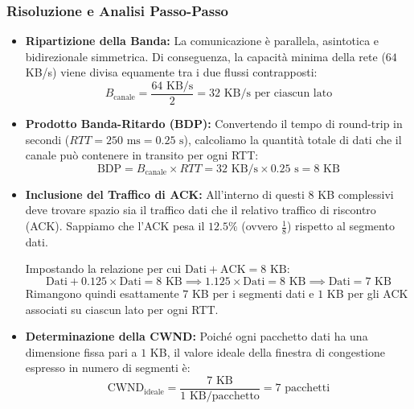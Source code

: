 \documentclass[11pt,a4paper]{report}
\begin{document}
\subsubsection*{Risoluzione e Analisi Passo-Passo}
\begin{itemize}
    \item \textbf{Ripartizione della Banda:} La comunicazione è parallela, asintotica e bidirezionale simmetrica. Di conseguenza, la capacità minima della rete ($64$ KB/s) viene divisa equamente tra i due flussi contrapposti:
    \begin{equation}
        B_{\text{canale}} = \frac{64 \text{ KB/s}}{2} = 32 \text{ KB/s per ciascun lato}
    \end{equation}

    \item \textbf{Prodotto Banda-Ritardo (BDP):} Convertendo il tempo di round-trip in secondi ($RTT = 250 \text{ ms} = 0.25 \text{ s}$), calcoliamo la quantità totale di dati che il canale può contenere in transito per ogni RTT:
    \begin{equation}
        \text{BDP} = B_{\text{canale}} \times RTT = 32 \text{ KB/s} \times 0.25 \text{ s} = 8 \text{ KB}
    \end{equation}

    \item \textbf{Inclusione del Traffico di ACK:} All'interno di questi $8$ KB complessivi deve trovare spazio sia il traffico dati che il relativo traffico di riscontro (ACK). Sappiamo che l'ACK pesa il $12.5\%$ (ovvero $\frac{1}{8}$) rispetto al segmento dati. 
    
    Impostando la relazione per cui $\text{Dati} + \text{ACK} = 8 \text{ KB}$:
    \begin{equation}
        \text{Dati} + 0.125 \times \text{Dati} = 8 \text{ KB} \implies 1.125 \times \text{Dati} = 8 \text{ KB} \implies \text{Dati} = 7 \text{ KB}
    \end{equation}
    Rimangono quindi esattamente $7$ KB per i segmenti dati e $1$ KB per gli ACK associati su ciascun lato per ogni RTT.

    \item \textbf{Determinazione della CWND:} Poiché ogni pacchetto dati ha una dimensione fissa pari a $1$ KB, il valore ideale della finestra di congestione espresso in numero di segmenti è:
    \begin{equation}
        \text{CWND}_{\text{ideale}} = \frac{7 \text{ KB}}{1 \text{ KB/pacchetto}} = 7 \text{ pacchetti}
    \end{equation}
\end{itemize}
\end{document}

